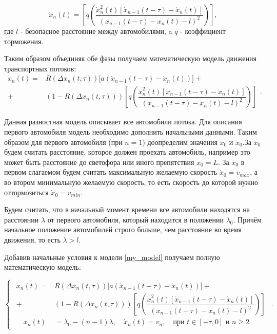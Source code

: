 \documentclass[12pt, a4paper]{extarticle}
\numberwithin{equation}{section}
\numberwithin{figure}{section}
\begin{document}
\begin{equation*}
\ddot{x}_n(t)= \left[  q\left(  \dfrac{\dot{x}_n^2(t)\left[  \dot{x}_{n-1}(t-\tau) - \dot{x}_n(t) \right]}{(x_{n-1}(t-\tau)-x_n(t)-l)^2}\right) \right],
\end{equation*}
где $l$ - безопасное расстояние между автомобилями, a $q$ - коэффициент торможения.

Таким образом объединяя обе фазы получаем математическую модель движения транспортных потоков:
\begin{equation} \label{my_model} 
\begin{split}
\ddot{x}_n(t)= &R(\Delta x_n(t,\tau))\bigg[ a(\dot{x}_{n-1}(t-\tau)-\dot{x}_n(t))\bigg]  +\\+& (1-R(\Delta x_n(t,\tau)))\left[  q\left(  \dfrac{\dot{x}_n^2(t)\left[  \dot{x}_{n-1}(t-\tau) - \dot{x}_n(t) \right]}{(x_{n-1}(t-\tau)-x_n(t)-l)^2}\right) \right] 
\end{split}.
\end{equation}

Данная разностная модель описывает все автомобили потока. Для описания первого автомобиля модель необходимо дополнить начальными данными. Таким образом для первого автомобиля (при $n=1$) доопределим значения $x_{0}$ и $\dot{x}_{0}$.За $x_{0}$ будем считать расстояние, которое должен проехать автомобиль, например это может быть расстояние до светофора или иного препятствия $x_{0}=L$. За $\dot{x}_{0}$ в первом слагаемом будем считать максимальную желаемую скорость $\dot{x}_{0}=v_{max}$, а во втором минимальную желаемую скорость, то есть скорость до которой нужно оттормозиться $\dot{x}_{0}=v_{min}$.

Будем считать, что в начальный момент времени все автомобили находятся на расстоянии $\lambda$ от первого автомобиля, который находится в положении $\lambda_0$. Причём начальное положение автомобилей строго больше, чем расстояние во время движения, то есть $\lambda > l$.

Добавив начальные условия к модели \eqref{my_model} получаем полную математическую модель:

\begin{equation} \label{new_model} 
\begin{cases}
\begin{split}
\ddot{x}_n(t)= &R(\Delta x_n(t,\tau))\bigg[ a(\dot{x}_{n-1}(t-\tau)-\dot{x}_n(t))\bigg]  +\\+& (1-R(\Delta x_n(t,\tau)))\left[  q\left(  \dfrac{\dot{x}_n^2(t)\left[  \dot{x}_{n-1}(t-\tau) - \dot{x}_n(t) \right]}{(x_{n-1}(t-\tau)-x_n(t)-l)^2}\right) \right] \\
 \quad x_n(t)&=\lambda_0-(n-1)\lambda, \quad \dot{x}_n(t)=v_{n}, \quad \text{при } t \in [-\tau,0] \text{ и } n\geq2
\end{split}
\end{cases}.
\end{equation}
\end{document}
